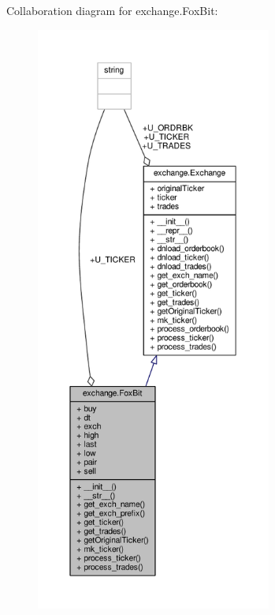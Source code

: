 Collaboration diagram for exchange.\+Fox\+Bit\+:\nopagebreak
\begin{figure}[H]
\begin{center}
\leavevmode
\includegraphics[height=550pt]{classexchange_1_1_fox_bit__coll__graph}
\end{center}
\end{figure}

